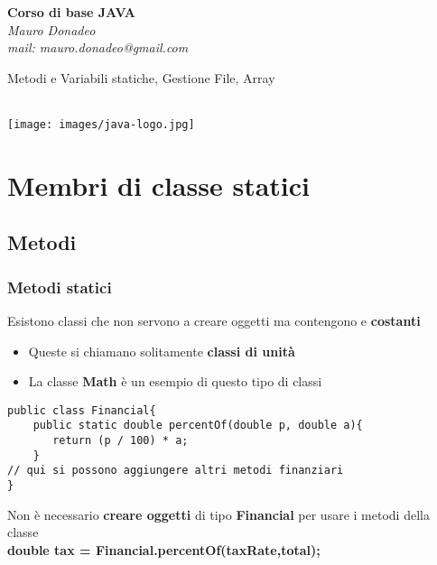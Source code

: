 \begin{frame}
	\begin{block}{}
		\begin{center}
			{\large\textbf{Corso di base JAVA}}\\
			\itshape{Mauro Donadeo}\\
			mail: mauro.donadeo@gmail.com
		\end{center}
	\end{block}
	\begin{block}{}	
		\begin{center}
			\begin{huge}
			Metodi e Variabili statiche, Gestione File, Array
			\end{huge}\\
			\texttt{[image: images/java-logo.jpg]}
		\end{center}
	\end{block}	
\end{frame}

\section*{Membri di classe statici}
\subsection*{Metodi}
\begin{frame}[fragile]
\frametitle{Metodi statici}
\begin{block}{}
Esistono classi che non servono a creare oggetti ma contengono \textbf{} e \textbf{costanti}
\begin{itemize}
\item Queste si chiamano solitamente \textbf{\alert{classi di unità}}
\item La classe \textbf{Math} è un esempio di questo tipo di classi
\end{itemize}
\end{block}
\pause
\begin{lstlisting}
public class Financial{
    public static double percentOf(double p, double a){
       return (p / 100) * a; 
    }
// qui si possono aggiungere altri metodi finanziari
}
\end{lstlisting}
\begin{block}{}\footnotesize
Non è necessario \textbf{creare oggetti} di tipo \textbf{Financial} per usare i metodi della classe\\
\hspace{0.8cm} \textbf{double tax = Financial.percentOf(taxRate,total);}
\end{block}
\end{frame}

